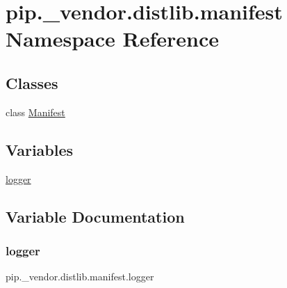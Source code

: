\hypertarget{namespacepip_1_1__vendor_1_1distlib_1_1manifest}{}\section{pip.\+\_\+vendor.\+distlib.\+manifest Namespace Reference}
\label{namespacepip_1_1__vendor_1_1distlib_1_1manifest}
\subsection*{Classes}
\begin{DoxyCompactItemize}
\item 
class \hyperlink{classpip_1_1__vendor_1_1distlib_1_1manifest_1_1Manifest}{Manifest}
\end{DoxyCompactItemize}
\subsection*{Variables}
\begin{DoxyCompactItemize}
\item 
\hyperlink{namespacepip_1_1__vendor_1_1distlib_1_1manifest_ab4660c654fe510e8a4ce64e31eab042a}{logger}
\end{DoxyCompactItemize}


\subsection{Variable Documentation}
\mbox{\label{namespacepip_1_1__vendor_1_1distlib_1_1manifest_ab4660c654fe510e8a4ce64e31eab042a}} 
\subsubsection{\texorpdfstring{logger}{logger}}
{\footnotesize\ttfamily pip.\+\_\+vendor.\+distlib.\+manifest.\+logger}

